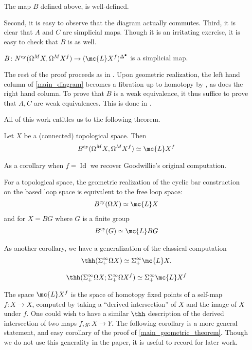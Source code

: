 \documentclass[11pt]{amsart}
\begin{document}
\begin{lem}
The map $B$ defined above, is well-defined. 
\end{lem}

Second, it is easy to observe that the diagram actually commutes. Third, it is clear that $A$ and $C$ are simplicial maps. Though it is an irritating exercise, it is easy to check that $B$ is as well. 

\begin{prop}
$ B \colon  N^{\text{cy}} (\Omega^M X, \Omega^M X^f) \to (\mc{L} X^f)^{\Delta^\bullet}$ is a simplicial map.
\end{prop}


The rest of the proof proceeds as in \cite[Sect.~V]{goodwillie_cyclic}. Upon geometric realization, the left hand column of \ref{main_diagram} becomes a fibration up to homotopy by \cite{segal}, as does the right hand column. To prove that $B$ is a weak equivalence, it thus suffice to prove that $A, C$ are weak equivalences. This is done in \cite[Sect.~V]{goodwillie_cyclic}. 


All of this work entitles us to the following theorem. 

\begin{thm}\label{main_geometric_theorem}
  Let $X$ be a (connected) topological space. Then
  \[
  B^{\text{cy}}(\Omega^M X, \Omega^M X^f) \simeq \mc{L} X^f 
  \]
\end{thm}

As a corollary when $f = \operatorname{Id}$ we recover Goodwillie's original computation.

\begin{cor}\cite[Sect.~V.1]{goodwillie_cyclic} For a topological space, the geometric realization of the cyclic bar construction on the based loop space is equivalent to the free loop space:
  \[
  B^{\text{cy}}(\Omega X) \simeq \mc{L} X 
  \]
  and for $X = BG$ where $G$ is a finite group
  \[
  B^{\text{cy}} (G) \simeq \mc{L} BG
  \]
\end{cor}

As another corollary, we have a generalization of the classical computation \[\thh (\Sigma^\infty_+ \Omega X) \simeq \Sigma^\infty_+ \mc{L} X.\] 

\begin{cor}\label{cor:identify_thh_loop}
  \[
  \thh(\Sigma^\infty_+\Omega X; \Sigma^\infty_+ \Omega X^f) \simeq \Sigma^\infty_+ \mc{L} X^f 
  \]
\end{cor}

The space $\mc{L} X^f$ is the space of homotopy fixed points of a self-map $f\colon  X \to X$, computed by taking a ``derived intersection'' of $X$ and the image of $X$ under $f$. One could wish to have a similar $\thh$ description of the derived intersection of two maps $f, g\colon  X \to Y$. The following corollary is a more general statement, and easy corollary of the proof of \cref{main_geometric_theorem}. Though we do not use this generality in the paper, it is useful to record for later work. 
\end{document}
